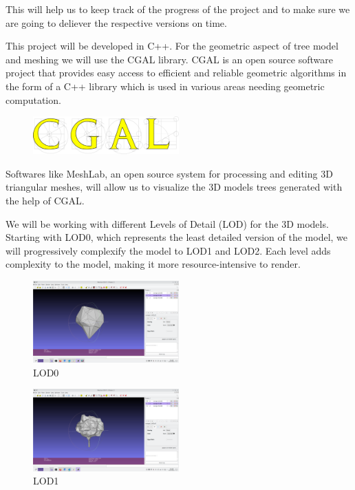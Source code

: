 \documentclass[12pt]{article}
\begin{document}
This will help us to keep track of the progress of the project and to make sure
we are going to deliever the respective versions on time.

This project will be developed in C++.
For the geometric aspect of tree model and meshing we will use the CGAL library.
CGAL is an open source software project that provides easy access to efficient
and reliable geometric algorithms in the form of a C++ library which is used
in various areas needing geometric computation.\cite{cgal}

\begin{figure}[H]
    \vspace{1.5cm}
    \centering
    \includegraphics[width=0.5\textwidth]{images/cgal_logo.png}
\end{figure}

Softwares like MeshLab, an open source system for processing and editing 3D
triangular meshes\cite{meshlab}, will allow us to visualize the 3D models trees generated with
the help of CGAL.

We will be working with different Levels of Detail (LOD) for the 3D models.
Starting with LOD0, which represents the least detailed version of the model,
we will progressively complexify the model to LOD1 and LOD2.
Each level adds complexity to the model, making it more
resource-intensive to render.



\begin{figure}[H]
    \vspace{1.5cm}
    \centering
    \includegraphics[width=0.5\textwidth]{images/LOD0.png}
    \caption{LOD0}
\end{figure}

\begin{figure}[H]
    \vspace{1.5cm}
    \centering
    \includegraphics[width=0.5\textwidth]{images/LOD1.png}
    \caption{LOD1}
\end{figure}
\end{document}
